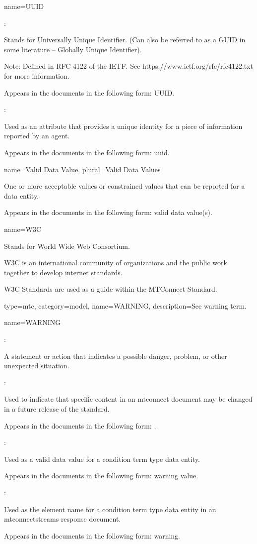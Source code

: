 {
  name={UUID}
}
{
	:

	Stands for Universally Unique Identifier. (Can also be referred to as a GUID in some literature – Globally Unique Identifier).

	Note:  Defined in RFC 4122 of the IETF.  See https://www.ietf.org/rfc/rfc4122.txt for more information.

	Appears in the documents in the following form: UUID.

	:

	Used as an attribute that provides a unique identity for a piece of information reported by an \gls{agent}.

	Appears in the documents in the following form: \gls{uuid}.
}


{
  name={Valid Data Value},
  plural={Valid Data Values}
}
{
	One or more acceptable values or constrained values that can be reported for a \gls{data entity}.

	Appears in the documents in the following form: \gls{valid data value}(s).
}


{
  name={W3C}
}
{
	Stands for World Wide Web Consortium.

	W3C is an international community of organizations and the public work together to develop internet standards.  

	W3C Standards are used as a guide within the MTConnect Standard.
}


{
  type=mtc,
  category=model,
  name={WARNING},
  description={See \gls{warning term}.}
}


{
  name={WARNING}
}
{
	:

	A statement or action that indicates a possible danger, problem, or other unexpected situation.

	:

	Used to indicate that specific content in an \gls{mtconnect document} may be changed in a future release of the standard.

	Appears in the documents in the following form: \WARNING.

	:

	Used as a \gls{valid data value} for a \gls{condition term} type \gls{data entity}.

	Appears in the documents in the following form: \gls{warning value}.

	:

	Used as the \gls{element name} for a \gls{condition term} type \gls{data entity} in an \gls{mtconnectstreams response document}.

	Appears in the documents in the following form: \gls{warning}.
}



